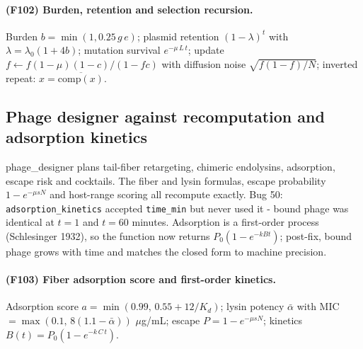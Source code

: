 \paragraph{(F102) Burden, retention and selection recursion.} Burden $b=\min(1,0.25\,g\,e)$; plasmid retention $(1-\lambda)^t$ with $\lambda=\lambda_0(1+4b)$; mutation survival $e^{-\mu\,L\,t}$; update $f\leftarrow f(1-\mu)(1-c)/(1-fc)$ with diffusion noise $\sqrt{f(1-f)/N}$; inverted repeat: $x=\overline{\mathrm{comp}(x)}$.
\subsection{Phage designer against recomputation and adsorption kinetics}
phage\_designer plans tail-fiber retargeting, chimeric endolysins, adsorption, escape risk and cocktails. The fiber and lysin formulas, escape probability $1-e^{-\mu s N}$ and host-range scoring all recompute exactly. Bug 50: \texttt{adsorption\_kinetics} accepted \texttt{time\_min} but never used it - bound phage was identical at $t=1$ and $t=60$ minutes. Adsorption is a first-order process (Schlesinger 1932), so the function now returns $P_0(1-e^{-kBt})$; post-fix, bound phage grows with time and matches the closed form to machine precision.
\paragraph{(F103) Fiber adsorption score and first-order kinetics.} Adsorption score $a=\min(0.99,\,0.55+12/K_d)$; lysin potency $\bar\alpha$ with MIC $=\max(0.1,\,8(1.1-\bar\alpha))$ $\mu$g/mL; escape $P=1-e^{-\mu s N}$; kinetics $B(t)=P_0(1-e^{-k\,C\,t})$.
